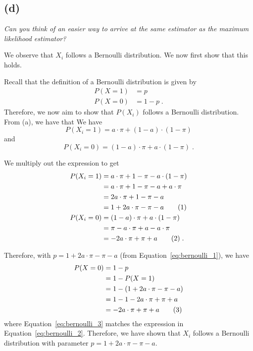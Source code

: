 \documentclass{article}
\newcommand{\stepandtag}{%
  \refstepcounter{equation}%
  \tag{\theequation}%
}
\begin{document}





\subsection*{(d)}
\textit{Can you think of an easier way to arrive at the same estimator as the maximum likelihood estimator?}

We observe that $X_i$ follows a Bernoulli distribution. We now first show that this holds. 

Recall that the definition of a Bernoulli distribution is given by 
\begin{align*}
    P(X=1) &= p \\
    P(X=0) &= 1-p \;.
\end{align*}
Therefore, we now aim to show that $P(X_i)$ follows a Bernoulli distribution. 
From (a), we have that
We have
\begin{equation*}
    P(X_i = 1) = a \cdot \pi + (1-a) \cdot (1-\pi)
\end{equation*}
and
\begin{equation*}
    P(X_i = 0) = (1-a) \cdot \pi + a \cdot (1-\pi) \;.
\end{equation*}

We multiply out the expression to get
\begin{align*}
    P(X_i = 1) &= a \cdot \pi + 1-\pi - a \cdot (1-\pi) \\
    &= a \cdot \pi + 1-\pi - a + a \cdot \pi \\
    &= 2a \cdot \pi + 1 - \pi - a \\ 
    &= 1 + 2a \cdot \pi - \pi - a \stepandtag \label{eq:bernoulli_1} \\ 
    P(X_i = 0) &= (1-a) \cdot \pi + a \cdot (1-\pi) \\
    &= \pi - a \cdot \pi + a - a \cdot \pi  \\
    &= -2a\cdot \pi + \pi + a \stepandtag \label{eq:bernoulli_2}\;.
\end{align*}

Therefore, with $p = 1 + 2a \cdot \pi - \pi - a$ (from Equation~\ref{eq:bernoulli_1}), we have
\begin{align*}
    P(X=0) 
    &= 1 - p \\
    &= 1 - P(X=1) \\
    &= 1 - (1 + 2a \cdot \pi - \pi - a) \\
    &= 1 - 1 - 2a \cdot \pi + \pi + a \\
    &= - 2a \cdot \pi + \pi + a \stepandtag \label{eq:bernoulli_3}
\end{align*}
where Equation~\ref{eq:bernoulli_3} matches the expression in Equation~\ref{eq:bernoulli_2}.
Therefore, we have shown that $X_i$ follows a Bernoulli distribution with parameter $p = 1 + 2a \cdot \pi - \pi - a$.
\end{document}
